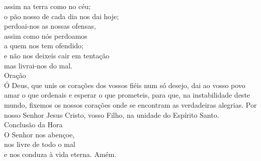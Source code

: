 \documentclass[opennany]{book}
\begin{document}
\begin{center}
    assim na terra como no céu; \\
    o pão nosso de cada dia nos dai hoje; \\
    perdoai-nos as nossas ofensas, \\
    assim como nós perdoamos \\
    a quem nos tem ofendido; \\
    e não nos deixeis cair em tentação \\
    mas livrai-nos do mal.
    \vspace{.2cm} \\
    \textcolor{VioletRed2}{Oração}
    \vspace{.2cm} \\
    Ó Deus, que unis os corações dos vossos fiéis num só desejo, dai ao vosso povo amar o que ordenais e esperar o que prometeis, para que, na instabilidade deste mundo, fixemos os nossos corações onde se encontram as verdadeiras alegrias. Por nosso Senhor Jesus Cristo, vosso Filho, na unidade do Espírito Santo.
    \vspace{.2cm} \\
    \textcolor{VioletRed2}{Conclusão da Hora}
    \vspace{.2cm} \\
    O Senhor nos abençoe, \\
    nos livre de todo o mal \\
    e nos conduza à vida eterna. Amém.
\end{center}
\end{document}

